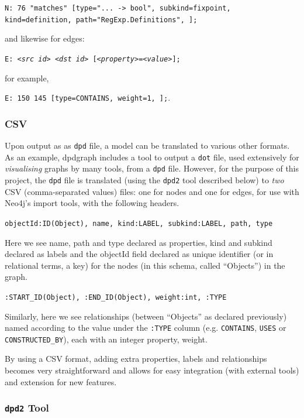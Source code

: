 {\tt N: 76 "matches" [type="... -> bool", subkind=fixpoint, kind=definition, path="RegExp.Definitions", ];}

and likewise for edges:

{\tt E: \emph{<src id>} \emph{<dst id>} [\emph{<property>}=\emph{<value>}];}

for example, 

{\tt E: 150 145 [type=CONTAINS, weight=1, ];}.

\subsubsection{CSV}\label{subsubsec:translationcsv}

Upon output as as \texttt{dpd} file, a model can be translated to various
other formats. As an example, dpdgraph includes a tool to output a \texttt{dot}
file, used extensively for \emph{visualising} graphs by many tools, from a
\texttt{dpd} file. However, for the purpose of this project, the \texttt{dpd}
file is translated (using the \texttt{dpd2} tool described below) to \emph{two}
CSV (comma-separated values) files: one for nodes and one for edges, for use
with Neo4j's import tools, with the following headers.

{\tt objectId:ID(Object), name, kind:LABEL, subkind:LABEL, path, type}

Here we see name, path and type declared as properties, kind and subkind
declared as labels and the objectId field declared as unique identifier (or in
relational terms, a key) for the nodes (in this schema, called ``Objects'') in
the graph.

{\tt :START\_ID(Object), :END\_ID(Object), weight:int, :TYPE}

Similarly, here we see relationships (between ``Objects'' as declared
previously) named according to the value under the \texttt{:TYPE} column (e.g.
\texttt{CONTAINS}, \texttt{USES} or \texttt{CONSTRUCTED\_BY}), each with an
integer property, weight.

By using a CSV format, adding extra properties, labels and relationships becomes
very straightforward and allows for easy integration (with external tools) and
extension for new features.

\subsubsection{\texttt{dpd2} Tool}\label{subsubsec:dpd2}

